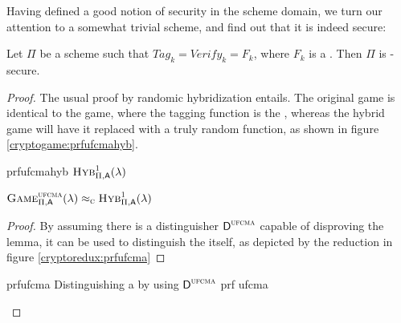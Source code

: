 Having defined a good notion of security in the \mac{} scheme domain, we turn our attention to a somewhat trivial scheme, and find out that it is indeed secure:

\begin{theorem}
    Let $\Pi$ be a \mac{} scheme such that $\textit{Tag}_k = \textit{Verify}_k = F_k$, where $F_k$ is a \prf. Then $\Pi$ is \ufcma-secure.
\end{theorem}

\begin{proof}
    The usual proof by randomic hybridization entails. The original game is identical to the \ufcma{} game, where the tagging function is the \prf, whereas the hybrid game will have it replaced with a truly random function, as shown in figure \ref{cryptogame:prfufcmahyb}.

    \begin{cryptogame}
        {prfufcmahyb}
        {$\hybridg{1}(\lambda)$}
        {}


        \cseqbeginloop
        \cseqendloop

        \cseqdelay


    \end{cryptogame}

    \begin{lemma}
        $\cryptog{ufcma}(\lambda) \compindist \hybridg{1}(\lambda)$  
    \end{lemma}

    \begin{proof}
        By assuming there is a distinguisher $\textsf{D}^{\textsc{ufcma}}$ capable of disproving the lemma, it can be used to distinguish the \prf{} itself, as depicted by the reduction in figure \ref{cryptoredux:prfufcma}
    \end{proof}

    \begin{cryptoredux}
        {prfufcma}
        {Distinguishing a \prf{} by using $\textsf{D}^{\textsc{ufcma}}$}
        {prf}
        {ufcma}

    

\end{cryptoredux}
\end{proof}
